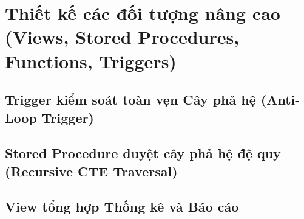 \section{Thiết kế các đối tượng nâng cao (Views, Stored Procedures, Functions, Triggers)}
\label{sec:3_4_doi_tuong_nang_cao}

\subsection{Trigger kiểm soát toàn vẹn Cây phả hệ (Anti-Loop Trigger)}

\subsection{Stored Procedure duyệt cây phả hệ đệ quy (Recursive CTE Traversal)}

\subsection{View tổng hợp Thống kê và Báo cáo}
